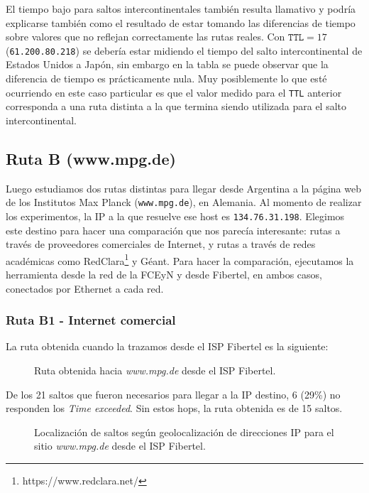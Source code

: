 El tiempo bajo para saltos intercontinentales también resulta llamativo y podría
explicarse también como el resultado de estar tomando las diferencias de tiempo
sobre valores que no reflejan correctamente las rutas reales. Con $\texttt{TTL}
= 17$ (\texttt{61.200.80.218}) se debería estar midiendo el tiempo del salto
intercontinental de Estados Unidos a Japón, sin embargo en la tabla se puede
observar que la diferencia de tiempo es prácticamente nula. Muy posiblemente lo
que esté ocurriendo en este caso particular es que el valor medido para el
\texttt{TTL} anterior corresponda a una ruta distinta a la que termina siendo
utilizada para el salto intercontinental.


\subsection{Ruta B (www.mpg.de)}

Luego estudiamos dos rutas distintas para llegar desde Argentina a la página web de los Institutos Max Planck (\texttt{www.mpg.de}), en Alemania. Al momento de realizar los experimentos, la IP a la que resuelve ese host es \texttt{134.76.31.198}. Elegimos este destino para hacer una comparación que nos parecía interesante: rutas a través de proveedores comerciales de Internet, y rutas a través de redes académicas como RedClara\footnote{https://www.redclara.net/} y Géant. Para hacer la comparación, ejecutamos la herramienta desde la red de la FCEyN y desde Fibertel, en ambos casos, conectados por Ethernet a cada red.

\subsubsection{Ruta B1 - Internet comercial}


La ruta obtenida cuando la trazamos desde el ISP Fibertel es la siguiente:

\begin{figure}[H]
    \caption{Ruta obtenida hacia \emph{www.mpg.de} desde el ISP Fibertel.}
    \label{res:escB1:table}
\end{figure}

De los 21 saltos que fueron necesarios para llegar a la IP destino, 6 (29\%) no responden los \emph{Time exceeded}. Sin estos hops, la ruta obtenida es de 15 saltos.

\begin{figure}[H]
    \caption{Localización de saltos según geolocalización de direcciones IP para
    el sitio \emph{www.mpg.de} desde el ISP Fibertel.}
    \label{res:escb1:map}
\end{figure}

